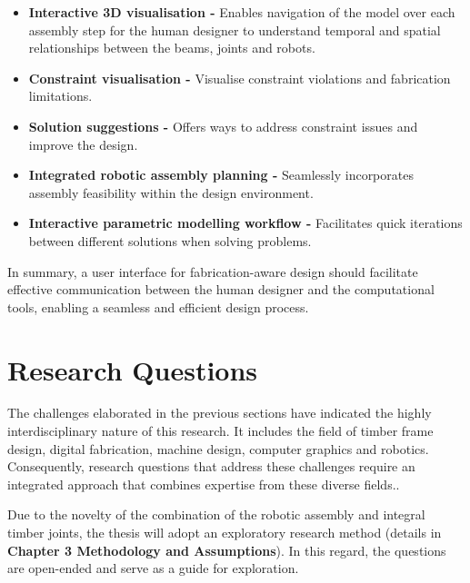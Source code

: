 \begin{itemize}
	\item \textbf{Interactive 3D visualisation - }Enables navigation of the model over each assembly step for the human designer to understand temporal and spatial relationships between the beams, joints and robots.

	\item \textbf{Constraint visualisation - }Visualise constraint violations and fabrication limitations. 

	\item \textbf{Solution suggestions - }Offers ways to address constraint issues and improve the design.

	\item \textbf{Integrated robotic assembly planning -} Seamlessly incorporates assembly feasibility within the design environment.

	\item \textbf{Interactive parametric modelling workflow - }Facilitates quick iterations between different solutions when solving problems.

\end{itemize}
In summary, a user interface for fabrication-aware design should facilitate effective communication between the human designer and the computational tools, enabling a seamless and efficient design process. 

\section{Research Questions}

The challenges elaborated in the previous sections have indicated the highly interdisciplinary nature of this research. It includes the field of timber frame design, digital fabrication, machine design, computer graphics and robotics. Consequently, research questions that address these challenges require an integrated approach that combines expertise from these diverse fields..

Due to the novelty of the combination of the robotic assembly and integral timber joints, the thesis will adopt an exploratory research method (details in \textbf{Chapter 3 Methodology and Assumptions}). In this regard, the questions are open-ended and serve as a guide for exploration. 

